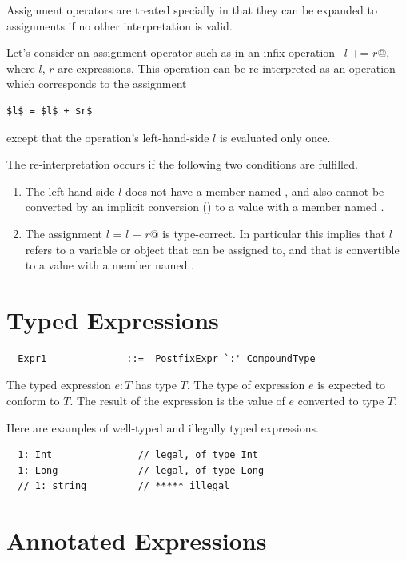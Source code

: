 Assignment operators are treated specially in that they
can be expanded to assignments if no other interpretation is valid.

Let's consider an assignment operator such as \code{+=} in an infix
operation ~\lstinline@$l$ += $r$@, where $l$, $r$ are expressions.  
This operation can be re-interpreted as an operation which corresponds 
to the assignment
\begin{lstlisting}
$l$ = $l$ + $r$
\end{lstlisting}
except that the operation's left-hand-side $l$ is evaluated only once.

The re-interpretation occurs if the following two conditions are fulfilled.
\begin{enumerate}
\item 
The left-hand-side $l$ does not have a member named
\code{+=}, and also cannot be converted by an implicit conversion ()
to a value with a member named \code{+=}.
\item
The assignment \lstinline@$l$ = $l$ + $r$@ is type-correct. 
In particular this implies that $l$ refers to a variable or object 
that can be assigned to, and that is convertible to a value with a member named \code{+}.
\end{enumerate}

\section{Typed Expressions}

\syntax\begin{lstlisting}
  Expr1              ::=  PostfixExpr `:' CompoundType
\end{lstlisting}

The typed expression $e: T$ has type $T$. The type of
expression $e$ is expected to conform to $T$. The result of
the expression is the value of $e$ converted to type $T$.

\example Here are examples of well-typed and illegally typed expressions.

\begin{lstlisting}
  1: Int               // legal, of type Int
  1: Long              // legal, of type Long
  // 1: string         // ***** illegal
\end{lstlisting}



\section{Annotated Expressions}

